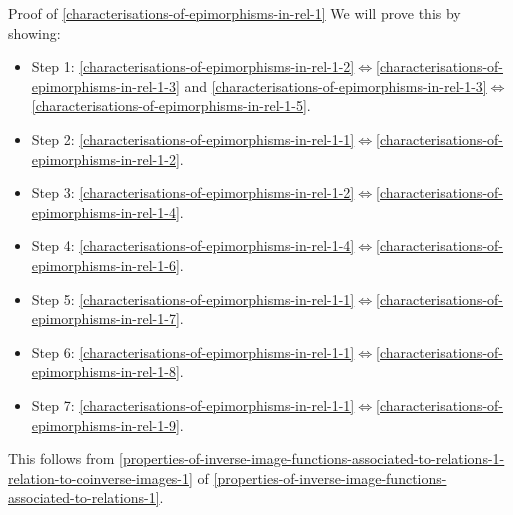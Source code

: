 \begin{Proof}{Proof of \cref{characterisations-of-epimorphisms-in-rel-1}}%
    We will prove this by showing:
    \begin{itemize}
        \item Step 1: \cref{characterisations-of-epimorphisms-in-rel-1-2}$\iff$\cref{characterisations-of-epimorphisms-in-rel-1-3} and \cref{characterisations-of-epimorphisms-in-rel-1-3}$\iff$\cref{characterisations-of-epimorphisms-in-rel-1-5}.
        \item Step 2: \cref{characterisations-of-epimorphisms-in-rel-1-1}$\iff$\cref{characterisations-of-epimorphisms-in-rel-1-2}.
        \item Step 3: \cref{characterisations-of-epimorphisms-in-rel-1-2}$\iff$\cref{characterisations-of-epimorphisms-in-rel-1-4}.
        \item Step 4: \cref{characterisations-of-epimorphisms-in-rel-1-4}$\iff$\cref{characterisations-of-epimorphisms-in-rel-1-6}.
        \item Step 5: \cref{characterisations-of-epimorphisms-in-rel-1-1}$\iff$\cref{characterisations-of-epimorphisms-in-rel-1-7}.
        \item Step 6: \cref{characterisations-of-epimorphisms-in-rel-1-1}$\iff$\cref{characterisations-of-epimorphisms-in-rel-1-8}.
        \item Step 7: \cref{characterisations-of-epimorphisms-in-rel-1-1}$\iff$\cref{characterisations-of-epimorphisms-in-rel-1-9}.
    \end{itemize}

    This follows from \cref{properties-of-inverse-image-functions-associated-to-relations-1-relation-to-coinverse-images-1} of \cref{properties-of-inverse-image-functions-associated-to-relations-1}.


\end{Proof}
